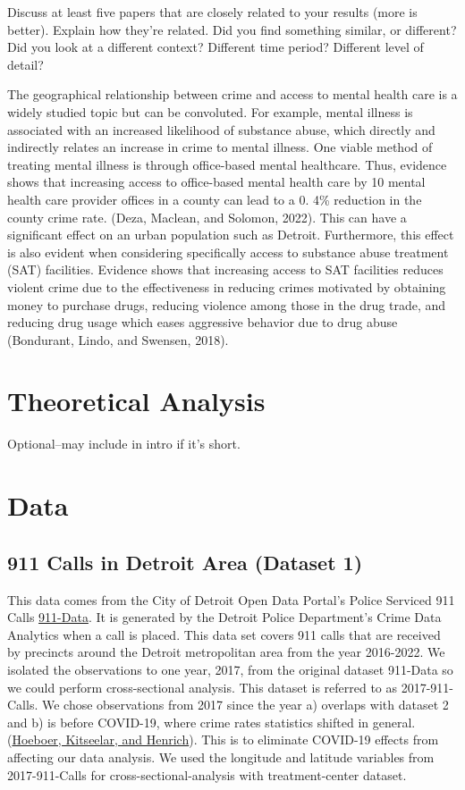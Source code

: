 \documentclass[12pt]{article}
\begin{document}
Discuss at least five papers that are closely related to your results (more is better). Explain how they're related. Did you find something similar, or different? Did you look at a different context? Different time period? Different level of detail?

The geographical relationship between crime and access to mental health care is a widely studied topic but can be convoluted. For example, mental illness is associated with an increased likelihood of substance abuse, which directly and indirectly relates an increase in crime to mental illness. One viable method of treating mental illness is through office-based mental healthcare. Thus, evidence shows that increasing access to office-based mental health care by 10 mental health care provider offices in a county can lead to a 0. 4\% reduction in the county crime rate. (Deza, Maclean, and Solomon, 2022). This can have a significant effect on an urban population such as Detroit. Furthermore, this effect is also evident when considering specifically access to substance abuse treatment (SAT) facilities. Evidence shows that increasing access to SAT facilities reduces violent crime due to the effectiveness in reducing crimes motivated by obtaining money to purchase drugs, reducing violence among those in the drug trade, and reducing drug usage which eases aggressive behavior due to drug abuse (Bondurant, Lindo, and Swensen, 2018).

\section{Theoretical Analysis}
\label{sec:theory}
Optional--may include in intro if it's short.


\section{Data}
\label{sec:data}

\subsection{911 Calls in Detroit Area (Dataset 1)}

This data comes from the City of Detroit Open Data Portal's Police Serviced 911 Calls  \href{https://data.detroitmi.gov/datasets/detroitmi::police-serviced-911-calls/about}{911-Data}. It is generated by the Detroit Police Department's Crime Data Analytics when a call is placed. This data set covers 911 calls that are received by precincts around the Detroit metropolitan area from the year 2016-2022. We isolated the observations to one year, 2017, from the original dataset 911-Data so we could perform cross-sectional analysis. This dataset is referred to as 2017-911-Calls. We chose observations from 2017 since the year a) overlaps with dataset 2 and b) is before COVID-19, where crime rates statistics shifted in general. (\href{https://doi.org/10.1007/s12103-023-09746-4}{Hoeboer, Kitseelar, and Henrich}). This is to eliminate COVID-19 effects from affecting our data analysis. We used the longitude and latitude variables from 2017-911-Calls for cross-sectional-analysis with treatment-center dataset.
\end{document}
